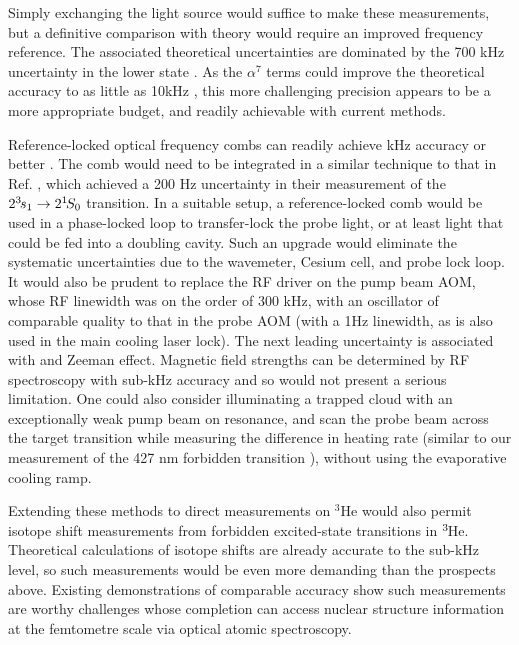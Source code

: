 	Simply exchanging the light source would suffice to make these measurements, but a definitive comparison with theory would require an improved frequency reference.
	The associated theoretical uncertainties are dominated by the 700 kHz uncertainty in the lower state \cite{Pachucki17,Wienczek19}.
	As the $\alpha^7$ terms could improve the theoretical accuracy to as little as 10kHz \cite{Pachucki17}, this more challenging precision appears to be a more appropriate budget, and readily achievable with current methods.
	
	Reference-locked optical frequency combs can readily achieve kHz accuracy or better \cite{Luo15,Rengelink18}.
	The comb would need to be integrated in a similar technique to that in Ref. \cite{Rengelink18}, which achieved a 200 Hz uncertainty in their measurement of the $2^{3\!} s_1 \rightarrow 2^{1\!} S_0$ transition.
	In a suitable setup, a reference-locked comb would be used in a phase-locked loop to transfer-lock the probe light, or at least light that could be fed into a doubling cavity.
	Such an upgrade would eliminate the systematic uncertainties due to the wavemeter, Cesium cell, and probe lock loop.
	It would also be prudent to replace the RF driver on the pump beam AOM, whose RF linewidth was on the order of 300 kHz, with an oscillator of comparable quality to that in the probe AOM (with a 1Hz linewidth, as is also used in the main cooling laser lock).
	The next leading uncertainty is associated with and Zeeman effect.
	Magnetic field strengths can be determined by RF spectroscopy with sub-kHz accuracy and so would not present a serious limitation.
	One could also consider illuminating a trapped cloud with an exceptionally weak pump beam on resonance, and scan the probe beam across the target transition while measuring the difference in heating rate (similar to our measurement of the  427 nm forbidden transition \cite{Thomas20}), without using the evaporative cooling ramp. 

	Extending these methods to direct measurements on $^3$He would also permit isotope shift measurements from forbidden excited-state transitions in $^{3\!}$He.
	Theoretical calculations of isotope shifts are already accurate to the sub-kHz level, so such measurements would be even more demanding than the prospects above.
	Existing demonstrations of comparable accuracy \cite{Rengelink18} show such measurements are worthy challenges whose completion can access nuclear structure information at the femtometre scale via optical atomic spectroscopy.


